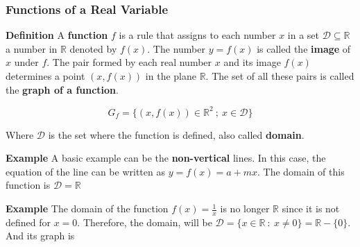 \documentclass[11pt]{article}
\begin{document}
    \hypertarget{functions-of-a-real-variable}{%
\subsubsection{Functions of a Real
Variable}\label{functions-of-a-real-variable}}

\textbf{Definition} A \textbf{function} \(f\) is a rule that assigns to
each number \(x\) in a set \(\mathcal{D}\subseteq\mathbb{R}\) a number
in \(\mathbb{R}\) denoted by \(f(x)\). The number \(y = f(x)\) is called
the \textbf{image} of \(x\) under \(f\). The pair formed by each real
number \(x\) and its image \(f(x)\) determines a point \((x, f(x))\) in
the plane \(\mathbb{R}\). The set of all these pairs is called the
\textbf{graph of a function}.

\[
G_f = \{(x,f(x))\in\mathbb{R}^2 \ ; \ x\in \mathcal{D}\}
\]

Where \(\mathcal{D}\) is the set where the function is defined, also
called \textbf{domain}.

\textbf{Example} A basic example can be the \textbf{non-vertical} lines.
In this case, the equation of the line can be written as
\(y = f(x) = a + m x\). The domain of this function is
\(\mathcal{D} = \mathbb{R}\)

\textbf{Example} The domain of the function \(f(x) = \frac{1}{x}\) is no
longer \(\mathbb{R}\) since it is not defined for \(x = 0\). Therefore,
the domain, will be
\(\mathcal{D} = \{x\in\mathbb{R} \ : \ x\neq 0\} = \mathbb{R} - \{0\}\).
And its graph is
\end{document}
